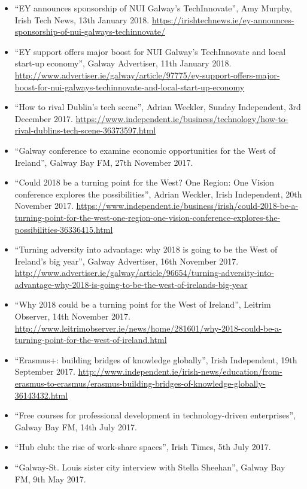 \documentclass[10pt,a4paper]{res} %
\begin{document}
\begin{resume}
{\begin{itemize}
\item ``EY announces sponsorship of NUI Galway's TechInnovate'', Amy Murphy, Irish Tech News, 13th January 2018. \url{https://irishtechnews.ie/ey-announces-sponsorship-of-nui-galways-techinnovate/}
\item ``EY support offers major boost for NUI Galway's TechInnovate and local start-up economy'', Galway Advertiser, 11th January 2018. \url{http://www.advertiser.ie/galway/article/97775/ey-support-offers-major-boost-for-nui-galways-techinnovate-and-local-start-up-economy}
\item ``How to rival Dublin's tech scene'', Adrian Weckler, Sunday Independent, 3rd December 2017. \url{https://www.independent.ie/business/technology/how-to-rival-dublins-tech-scene-36373597.html}
\item ``Galway conference to examine economic opportunities for the West of Ireland'', Galway Bay FM, 27th November 2017.
\item ``Could 2018 be a turning point for the West? One Region: One Vision conference explores the possibilities'', Adrian Weckler, Irish Independent, 20th November 2017. \url{https://www.independent.ie/business/irish/could-2018-be-a-turning-point-for-the-west-one-region-one-vision-conference-explores-the-possibilities-36336415.html}
\item ``Turning adversity into advantage: why 2018 is going to be the West of Ireland's big year'', Galway Advertiser, 16th November 2017. \url{http://www.advertiser.ie/galway/article/96654/turning-adversity-into-advantage-why-2018-is-going-to-be-the-west-of-irelands-big-year}
\item ``Why 2018 could be a turning point for the West of Ireland'', Leitrim Observer, 14th November 2017. \url{http://www.leitrimobserver.ie/news/home/281601/why-2018-could-be-a-turning-point-for-the-west-of-ireland.html}
\item ``Erasmus+: building bridges of knowledge globally'', Irish Independent, 19th September 2017. \url{http://www.independent.ie/irish-news/education/from-erasmus-to-erasmus/erasmus-building-bridges-of-knowledge-globally-36143432.html}
\item ``Free courses for professional development in technology-driven enterprises'', Galway Bay FM, 14th July 2017.
\item ``Hub club: the rise of work-share spaces'', Irish Times, 5th July 2017.
\item ``Galway-St. Louis sister city interview with Stella Sheehan'', Galway Bay FM, 9th May 2017.

\end{itemize}}
\end{resume}
\end{document}
